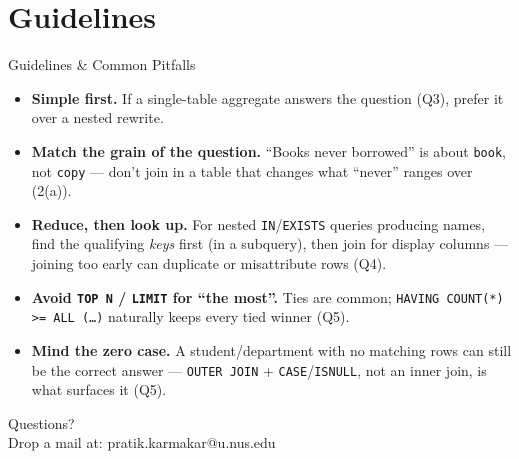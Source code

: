 \documentclass{beamer}
\begin{document}
\section{Guidelines}

\begin{frame}{Guidelines \& Common Pitfalls}
\small
\begin{itemize}\itemsep4pt
  \item \textbf{Simple first.} If a single-table aggregate answers the question (Q3), prefer it over a nested rewrite.
  \item \textbf{Match the grain of the question.} ``Books never borrowed'' is about \texttt{book}, not \texttt{copy} --- don't join in a table that changes what ``never'' ranges over (2(a)).
  \item \textbf{Reduce, then look up.} For nested \texttt{IN}/\texttt{EXISTS} queries producing names, find the qualifying \emph{keys} first (in a subquery), then join for display columns --- joining too early can duplicate or misattribute rows (Q4).
  \item \textbf{Avoid \texttt{TOP N} / \texttt{LIMIT} for ``the most''.} Ties are common; \texttt{HAVING COUNT(*) >= ALL (\ldots)} naturally keeps every tied winner (Q5).
  \item \textbf{Mind the zero case.} A student/department with no matching rows can still be the correct answer --- \texttt{OUTER JOIN} + \texttt{CASE}/\texttt{ISNULL}, not an inner join, is what surfaces it (Q5).
\end{itemize}
\end{frame}

\begin{frame}
\begin{center}
Questions?\\
Drop a mail at: pratik.karmakar@u.nus.edu
\end{center}
\end{frame}
\end{document}
